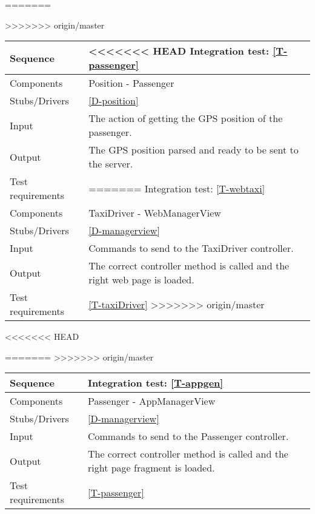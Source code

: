 \begin{table}[H]
=======
\begin{table}[H]
>>>>>>> origin/master
    \begin{tabularx}{\textwidth}{l|X}
        \hline
        Sequence
        & 
<<<<<<< HEAD
        Integration test: \ref{T-passenger}
        \\ \hline
        Components 
        & 
        Position - Passenger
        \\ \hline
        Stubs/Drivers 
        & 
        \ref{D-position}
        \\ \hline
        Input 
        & 
        The action of getting the GPS position of the passenger.
        \\ \hline
        Output 
        & 
        The GPS position parsed and ready to be sent to the server.
        \\ \hline
        Test requirements 
        & 
        
=======
        Integration test: \ref{T-webtaxi}
        \\ \hline
        Components 
        & 
        TaxiDriver -  WebManagerView
        \\ \hline
        Stubs/Drivers 
        & 
        \ref{D-managerview}
        \\ \hline
        Input 
        & 
        Commands to send to the TaxiDriver controller.
        \\ \hline
        Output 
        & 
        The correct controller method is called and the right web page is loaded.
        \\ \hline
        Test requirements 
        & 
        \ref{T-taxiDriver}
>>>>>>> origin/master
        \\ \hline
    \end{tabularx}
\end{table}

<<<<<<< HEAD

=======
>>>>>>> origin/master
\begin{table}[H]
    \begin{tabularx}{\textwidth}{l|X}
        \hline
        Sequence
        & 
        Integration test: \ref{T-appgen}
        \\ \hline
        Components 
        & 
        Passenger - AppManagerView
        \\ \hline
        Stubs/Drivers 
        & 
        \ref{D-managerview}
        \\ \hline
        Input 
        & 
        Commands to send to the Passenger controller.
        \\ \hline
        Output 
        & 
       The correct controller method is called and the right page fragment is loaded.
        \\ \hline
        Test requirements 
        & 
        \ref{T-passenger}
        \\ \hline
    \end{tabularx}
\end{table}


\end{table}
